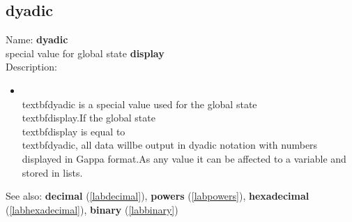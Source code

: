 \subsection{dyadic}
\label{labdyadic}
\noindent Name: \textbf{dyadic}\\
special value for global state \textbf{display}\\
\noindent Description: \begin{itemize}

\item \\textbf{dyadic} is a special value used for the global state \\textbf{display}.\n   If the global state \\textbf{display} is equal to \\textbf{dyadic}, all data will\n   be output in dyadic notation with numbers displayed in Gappa format.\n    \n   As any value it can be affected to a variable and stored in lists.\n\end{itemize}
See also: \textbf{decimal} (\ref{labdecimal}), \textbf{powers} (\ref{labpowers}), \textbf{hexadecimal} (\ref{labhexadecimal}), \textbf{binary} (\ref{labbinary})
